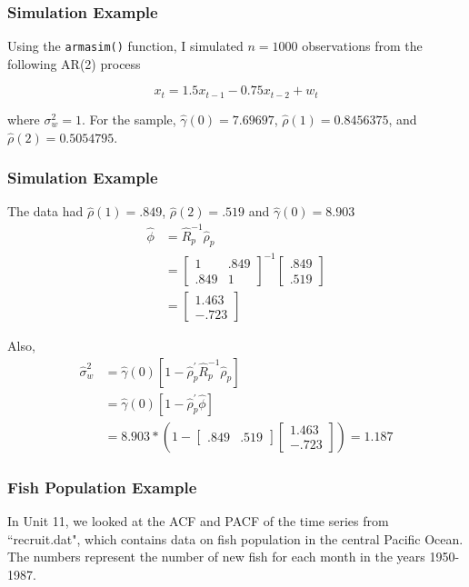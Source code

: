 \documentclass[%
xcolor=pdftex]{beamer}
\begin{document}
\begin{frame}[fragile]
\frametitle{Simulation Example}

Using the \verb=armasim()= function, I simulated $n=1000$ observations from the following AR(2) process

$$
x_t = 1.5 x_{t-1} - 0.75 x_{t-2} + w_t
$$

where $\sigma_w^2 = 1$. For the sample, $\hat{\gamma}(0) = 7.69697$, $\hat{\rho}(1)=0.8456375$, and $\hat{\rho}(2) = 0.5054795$.

\end{frame}

\begin{frame}
\frametitle{Simulation Example}

The data had $\hat{\rho}(1) = .849$, $\hat{\rho}(2) = .519$ and $\hat{\gamma}(0) = 8.903$
\begin{align*}
\hat{\phi} &= \hat{R}_p^{-1} \hat{\rho}_p \\
&= \begin{bmatrix}
1 & .849 \\
.849 & 1
\end{bmatrix}^{-1}
\begin{bmatrix}
.849 \\
.519
\end{bmatrix} \\
&= 
\begin{bmatrix}
1.463 \\
-.723
\end{bmatrix}
\end{align*}

Also, 
\begin{align*}
\hat{\sigma}_w^2 &= \hat{\gamma}(0) \left[ 1 - \hat{\rho}_p^{\prime} \hat{R}_p^{-1} \hat{\rho}_p \right] \\
&= \hat{\gamma}(0) \left[ 1 - \hat{\rho}_p^{\prime} \hat{\phi} \right] \\
&=  8.903 * (1 - \begin{bmatrix} .849 & .519 \end{bmatrix} \begin{bmatrix} 1.463 \\ -.723\end{bmatrix}) = 1.187
\end{align*}
\end{frame}




\begin{frame}
\frametitle{Fish Population Example}

In Unit 11, we looked at the ACF and PACF of the time series from ``recruit.dat", which contains data on fish population in the central Pacific Ocean. The numbers represent the number of new fish for each month in the years 1950-1987. 
\end{frame}
\end{document}
